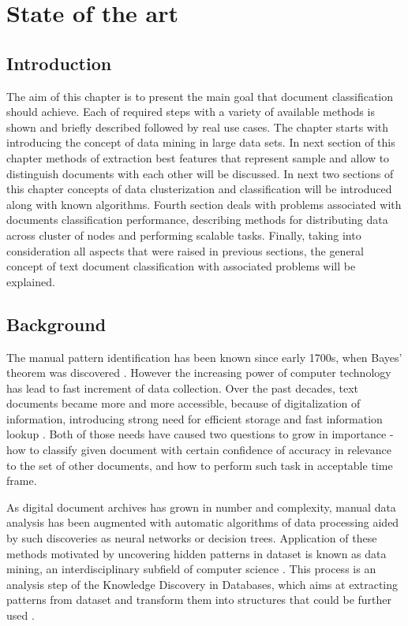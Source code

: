 \chapter{State of the art}
\label{state_of_art}

\section{Introduction}
The aim of this chapter is to present the main goal that document classification should achieve. Each of required steps with a variety of available methods is shown and briefly described followed by real use cases. The chapter starts with introducing the concept of data mining in large data sets. In next section of this chapter methods of extraction best features that represent sample and allow to distinguish documents with each other will be discussed. In next two sections of this chapter concepts of data clusterization and classification will be introduced along with known algorithms. Fourth section deals with problems associated with documents classification performance, describing methods for distributing data across cluster of nodes and performing scalable tasks. Finally, taking into consideration all aspects that were raised in previous sections, the general concept of text document classification with associated problems will be explained.

\section{Background}
The manual pattern identification has been known since early 1700s, when Bayes' theorem was discovered \cite{bayesian-history}. However the increasing power of computer technology has lead to fast increment of data collection. Over the past decades, text documents became more and more accessible, because of digitalization of information, introducing strong need for efficient storage and fast information lookup \cite{digitalization}. Both of those needs have caused two questions to grow in importance - how to classify given document with certain confidence of accuracy in relevance to the set of other documents, and how to perform such task in acceptable time frame.

As digital document archives has grown in number and complexity, manual data analysis has been augmented with automatic algorithms of data processing aided by such discoveries as neural networks or decision trees. Application of these methods motivated by uncovering hidden patterns in dataset is known as data mining, an interdisciplinary subfield of computer science \cite{data-mining}. This process is an analysis step of the Knowledge Discovery in Databases, which aims at extracting patterns from dataset and transform them into structures that could be further used \cite{data-mining-kdd}. 


